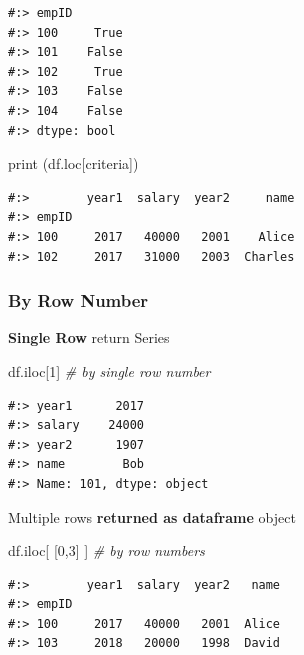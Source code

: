 \documentclass[
]{book}
\newenvironment{Shaded}{\begin{snugshade}}{\end{snugshade}}
\newcommand{\BuiltInTok}[1]{#1}
\newcommand{\CommentTok}[1]{\textcolor[rgb]{0.37,0.37,0.37}{\textit{#1}}}
\newcommand{\DecValTok}[1]{\textcolor[rgb]{0.06,0.06,0.06}{#1}}
\newcommand{\NormalTok}[1]{#1}
\begin{document}
\begin{verbatim}
#:> empID
#:> 100     True
#:> 101    False
#:> 102     True
#:> 103    False
#:> 104    False
#:> dtype: bool
\end{verbatim}

\begin{Shaded}
\begin{Highlighting}[]
\BuiltInTok{print}\NormalTok{ (df.loc[criteria])}
\end{Highlighting}
\end{Shaded}

\begin{verbatim}
#:>        year1  salary  year2     name
#:> empID                               
#:> 100     2017   40000   2001    Alice
#:> 102     2017   31000   2003  Charles
\end{verbatim}

\hypertarget{by-row-number}{%
\subsubsection{By Row Number}\label{by-row-number}}

\textbf{Single Row} return Series

\begin{Shaded}
\begin{Highlighting}[]
\NormalTok{df.iloc[}\DecValTok{1}\NormalTok{]  }\CommentTok{# by single row number}
\end{Highlighting}
\end{Shaded}

\begin{verbatim}
#:> year1      2017
#:> salary    24000
#:> year2      1907
#:> name        Bob
#:> Name: 101, dtype: object
\end{verbatim}

Multiple rows \textbf{returned as dataframe} object

\begin{Shaded}
\begin{Highlighting}[]
\NormalTok{df.iloc[ [}\DecValTok{0}\NormalTok{,}\DecValTok{3}\NormalTok{] ]    }\CommentTok{# by row numbers}
\end{Highlighting}
\end{Shaded}

\begin{verbatim}
#:>        year1  salary  year2   name
#:> empID                             
#:> 100     2017   40000   2001  Alice
#:> 103     2018   20000   1998  David
\end{verbatim}
\end{document}
